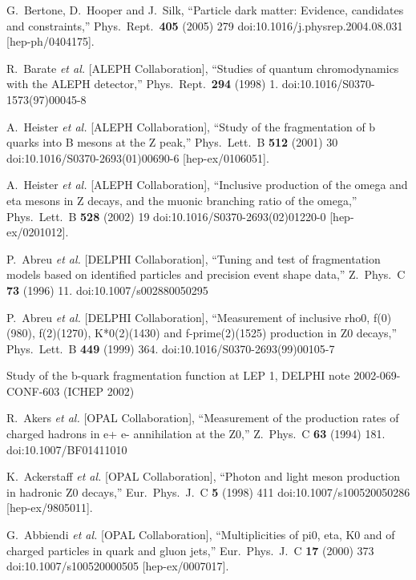 \documentclass[aps,preprint,floatfix,nofootinbib,showpacs]{revtex4-1}
\begin{document}
\begin{thebibliography}{99}
  G.~Bertone, D.~Hooper and J.~Silk,
  ``Particle dark matter: Evidence, candidates and constraints,''
  Phys.\ Rept.\  {\bf 405} (2005) 279
  doi:10.1016/j.physrep.2004.08.031
  [hep-ph/0404175].
  
  R.~Barate {\it et al.} [ALEPH Collaboration],
  ``Studies of quantum chromodynamics with the ALEPH detector,''
  Phys.\ Rept.\  {\bf 294} (1998) 1.
  doi:10.1016/S0370-1573(97)00045-8
  
  A.~Heister {\it et al.} [ALEPH Collaboration],
  ``Study of the fragmentation of b quarks into B mesons at the Z peak,''
  Phys.\ Lett.\ B {\bf 512} (2001) 30
  doi:10.1016/S0370-2693(01)00690-6
  [hep-ex/0106051].
  
  A.~Heister {\it et al.} [ALEPH Collaboration],
  ``Inclusive production of the omega and eta mesons in Z decays, and the muonic branching ratio of the omega,''
  Phys.\ Lett.\ B {\bf 528} (2002) 19
  doi:10.1016/S0370-2693(02)01220-0
  [hep-ex/0201012].
  
  P.~Abreu {\it et al.} [DELPHI Collaboration],
  ``Tuning and test of fragmentation models based on identified particles and precision event shape data,''
  Z.\ Phys.\ C {\bf 73} (1996) 11.
  doi:10.1007/s002880050295
  
  P.~Abreu {\it et al.} [DELPHI Collaboration],
  ``Measurement of inclusive rho0, f(0)(980), f(2)(1270), K*0(2)(1430) and f-prime(2)(1525) production in Z0 decays,''
  Phys.\ Lett.\ B {\bf 449} (1999) 364.
  doi:10.1016/S0370-2693(99)00105-7
  
  Study of the b-quark fragmentation function at LEP 1, 
  DELPHI note 2002-069-CONF-603 (ICHEP 2002)
  
  R.~Akers {\it et al.} [OPAL Collaboration],
  ``Measurement of the production rates of charged hadrons in e+ e- annihilation at the Z0,''
  Z.\ Phys.\ C {\bf 63} (1994) 181.
  doi:10.1007/BF01411010
  
  K.~Ackerstaff {\it et al.} [OPAL Collaboration],
  ``Photon and light meson production in hadronic Z0 decays,''
  Eur.\ Phys.\ J.\ C {\bf 5} (1998) 411
  doi:10.1007/s100520050286
  [hep-ex/9805011].
  
  G.~Abbiendi {\it et al.} [OPAL Collaboration],
  ``Multiplicities of pi0, eta, K0 and of charged particles in quark and gluon jets,''
  Eur.\ Phys.\ J.\ C {\bf 17} (2000) 373
  doi:10.1007/s100520000505
  [hep-ex/0007017].
  

\end{thebibliography}
\end{document}
